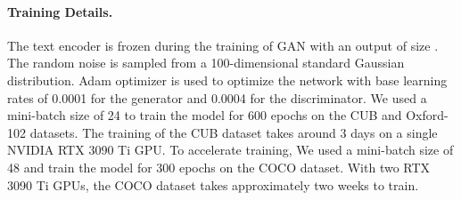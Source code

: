 \documentclass{article}
\begin{document}
	\paragraph{Training Details.}
	The text encoder is frozen during the training of GAN with an output of size . The random noise is sampled from a 100-dimensional standard Gaussian distribution.
	Adam optimizer is used to optimize the network with base learning rates of 	0.0001 for the generator and 0.0004 for the discriminator. We used a mini-batch size of 24 to train the model for 600 epochs on the CUB and Oxford-102 datasets. The training of the CUB dataset takes around 3 days on a single NVIDIA RTX 3090 Ti GPU. To accelerate training, We used a mini-batch size of 48 and train the model for 300 epochs on the COCO dataset. With two RTX 3090 Ti GPUs, the COCO dataset takes approximately two weeks to train. \begin{figure*}[t!h]
		\centering
		
		\begin{minipage}[c]{0.01\textwidth}
			\fontsize{2.0pt}{0.5\baselineskip}\selectfont \center{\ } 
		\end{minipage}
		\hfill
		\begin{minipage}[t]{0.115\textwidth}
		\end{minipage}
		\hfill
		\begin{minipage}[t]{0.115\textwidth}
		\end{minipage}
		\hfill
		\begin{minipage}[t]{0.115\textwidth}
		\end{minipage}
		\hfill
		\begin{minipage}[t]{0.115\textwidth}
		\end{minipage}
\hspace{1pt}
		\begin{minipage}[t]{0.115\textwidth}
		\end{minipage}
		\hfill
		\begin{minipage}[t]{0.115\textwidth}
		\end{minipage}
		\hfill
		\begin{minipage}[t]{0.115\textwidth}
		\end{minipage}
		\hfill
\begin{minipage}[t]{0.115\textwidth}
		\end{minipage}
		\vspace{2pt}
		

\end{figure*}
\end{document}
